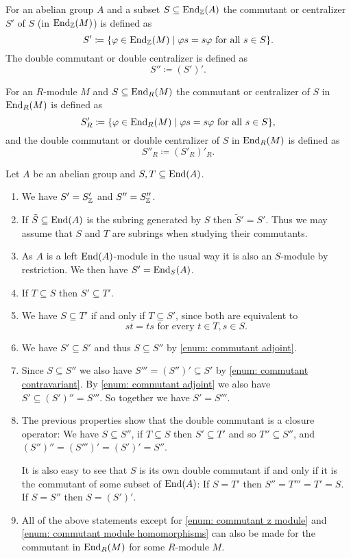 \begin{defi}
 For an abelian group $A$ and a subset $S \subseteq \operatorname{End}_{\mathbb{Z}}(A)$ the commutant or centralizer $S'$ of $S$ (in $\operatorname{End}_{\mathbb{Z}}(M)$) is defined as
 \[
  S' \coloneqq \{ \varphi \in \operatorname{End}_{\mathbb{Z}}(M) \mid \varphi s = s \varphi \text{ for all } s \in S \}.
 \]
 The double commutant or double centralizer is defined as
 \[
  S'' \coloneqq (S')'.
 \]
 
 For an $R$-module $M$ and $S \subseteq \operatorname{End}_R(M)$ the commutant or centralizer of $S$ in $\operatorname{End}_R(M)$ is defined as
 \[
  S'_R \coloneqq \{ \varphi \in \operatorname{End}_R(M) \mid \varphi s = s \varphi \text{ for all } s \in S \},
 \]
 and the double commutant or double centralizer of $S$ in $\operatorname{End}_R(M)$ is defined as
 \[
  S''_R \coloneqq (S'_R)'_R.
 \]
\end{defi}


\begin{rem}
 Let $A$ be an abelian group and $S, T \subseteq \operatorname{End}(A)$.
 \begin{enumerate}[label=\emph{\alph*}),leftmargin=*]
  \item \label{enum: commutant z module}
   We have $S' = S'_{\mathbb{Z}}$ and $S'' = S''_{\mathbb{Z}}$.
  \item
   If $\tilde{S} \subseteq \operatorname{End}(A)$ is the subring generated by $S$ then $\tilde{S}' = S'$. Thus we may assume that $S$ and $T$ are subrings when studying their commutants.
  \item \label{enum: commutant module homomorphisms}
   As $A$ is a left $\operatorname{End}(A)$-module in the usual way it is also an $S$-module by restriction. We then have $S' = \operatorname{End}_S(A)$.
  \item \label{enum: commutant contravariant}
   If $T \subseteq S$ then $S' \subseteq T'$.
  \item \label{enum: commutant adjoint}
   We have $S \subseteq T'$ if and only if $T \subseteq S'$, since both are equivalent to
   \[
    st = ts \text{ for every } t \in T, s \in S.
   \]
  \item
   We have $S' \subseteq S'$ and thus $S \subseteq S''$ by \ref{enum: commutant adjoint}.
  \item
   Since $S \subseteq S''$ we also have $S''' = (S'')' \subseteq S'$ by \ref{enum: commutant contravariant}. By \ref{enum: commutant adjoint} we also have $S' \subseteq (S')'' = S'''$. So together we have $S' = S'''$.
  \item
   The previous properties show that the double commutant is a closure operator: We have $S \subseteq S''$, if $T \subseteq S$ then $S' \subseteq T'$ and so $T'' \subseteq S''$, and $(S'')'' = (S''')' = (S')' = S''$.
   
   It is also easy to see that $S$ is its own double commutant if and only if it is the commutant of some subset of $\operatorname{End}(A)$: If $S = T'$ then $S'' = T''' = T' = S$. If $S = S''$ then $S = (S')'$.
  \item
   All of the above statements except for \ref{enum: commutant z module} and \ref{enum: commutant module homomorphisms} can also be made for the commutant in $\operatorname{End}_R(M)$ for some $R$-module $M$.
 \end{enumerate}
\end{rem}


